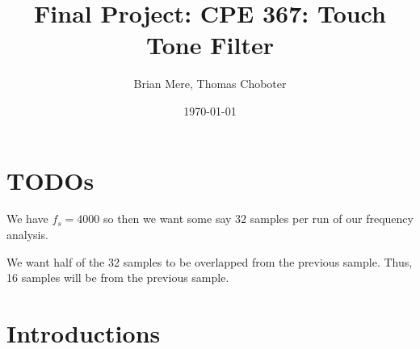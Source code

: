 \documentclass[12pt]{article}
\title{Final Project: CPE 367: Touch Tone Filter}
\author{Brian Mere, Thomas Choboter}
\date{\today}
\begin{document}
 

\inserttitlepage 

\section*{TODOs}

We have $f_s = 4000$ so then we want some say $32$ samples per 
run of our frequency analysis. 

We want half of the 32 samples to be overlapped from the previous sample. Thus, 
16 samples will be from the previous sample. 


\section*{Introductions}
\end{document}
